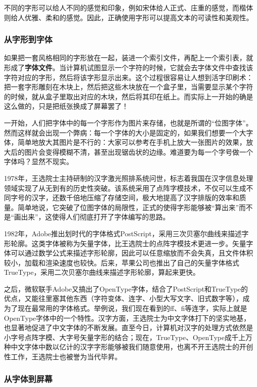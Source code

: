 不同的字形可以给人不同的感觉和印象，例如宋体给人正式、庄重的感觉，而楷体则给人优雅、柔和的感觉。因此，正确使用字形可以提高文本的可读性和美观性。

\subsubsection{从字形到字体}

如果把一套风格相同的字形放在一起，装进一个索引文件，再配上一个索引表，就形成了\textbf{字体文件}。当计算机试图显示一个字符的时候，它就会去字体文件中查找该字符对应的字形，然后将该字形显示出来。这个过程很容易让人想到活字印刷术：把一套字形雕刻在木块上，然后把这些木块放在一个盒子里，当需要显示某个字符的时候，就从盒子里取出对应的木块，然后将其印在纸上。而实际上一开始的确是这么做的，只是把纸张换成了屏幕罢了！

一开始，人们把字体中的每一个字形作为图片来存储，也就是所谓的“位图字体”。然而这样就会出现一个弊病：每一个字体的大小是固定的，如果我们想要一个大字体，简单地放大其图片是不行的：大家可以参考在手机上放大一张图片的效果，放大后的图片会变得模糊不清，甚至出现锯齿状的边缘。难道要为每一个字号做一个字体吗？显然不现实。

1978年，王选院士主持研制的汉字激光照排系统问世，标志着我国在汉字信息处理领域实现了从无到有的历史性突破。该系统采用了点阵字模技术，不仅可以生成不同字号的汉字，还数千倍地压缩了存储空间，极大地提高了汉字排版的效率和质量。简单地说，它突破了位图字体的局限性，正式的使得字形能够被“算出来”而不是“画出来”，这使得人们彻底打开了字体编写的思路。

1982年，Adobe推出划时代的字体格式PostScript，采用三次贝塞尔曲线来描述字形轮廓。这类字体被称为矢量字体，比王选院士的点阵字模技术更进一步。矢量字体可以通过数学公式来描述字形轮廓，因此可以任意缩放而不会失真，且文件体积较小，加载和渲染速度也较快。后来，苹果公司也推出了自己的矢量字体格式TrueType，采用二次贝塞尔曲线来描述字形轮廓，算起来更快。

之后，微软联手Adobe又搞出了OpenType字体，结合了PostScript和TrueType的优点，又能往里塞其他东西（字符变体、连字、小型大写文字、旧式数字等），成为了现在最常用的字体格式。举例说，我们现在看到的ff、fi等连字，实际上就是OpenType字体中的一个特性。汉字方面，王选院士为中文字体打下的坚实地基，也显著地促进了中文字体的不断发展。直至今日，计算机对汉字的处理方式依然是小字号点阵字模、大字号矢量字形的结合；现在，TrueType、OpenType成千上万种中文字体中数以亿计的汉字字形能够被我们随意使用，也离不开王选院士的开创性工作，王选院士也被誉为当代毕昇。

\subsubsection{从字体到屏幕}

